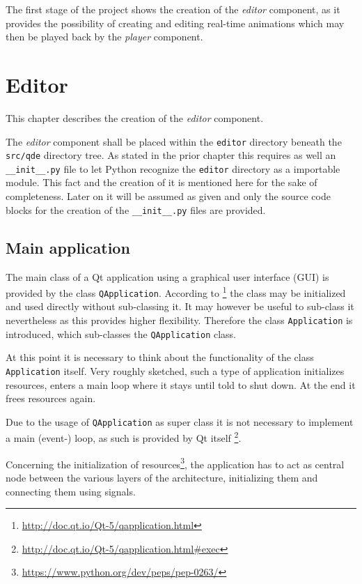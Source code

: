 \documentclass[10pt, openright, notitlepage]{scrreprt}
\begin{document}
The first stage of the project shows the creation of the \emph{editor} component, as
it provides the possibility of creating and editing real-time animations which
may then be played back by the \emph{player} component\cite[p. 29]{osterwalder_qde_2016}.

\section{Editor}
\label{sec:orgda4a1b1}

This chapter describes the creation of the \emph{editor} component.

The \emph{editor} component shall be placed within the \texttt{editor} directory beneath the
\texttt{src/qde} directory tree. As stated in the prior chapter this requires as well
an \texttt{\_\_init\_\_.py} file to let Python recognize the \texttt{editor} directory as a
importable module. This fact and the creation of it is mentioned here for the
sake of completeness. Later on it will be assumed as given and only the source
code blocks for the creation of the \texttt{\_\_init\_\_.py} files are provided.

\subsection{Main application}
\label{sec:org1b26239}

The main class of a Qt application using a graphical user interface (GUI)
is provided by the class \texttt{QApplication}. According to
\footnote{\url{http://doc.qt.io/Qt-5/qapplication.html}} the class may be initialized and
used directly without sub-classing it. It may however be useful to sub-class it
nevertheless as this provides higher flexibility. Therefore the class
\texttt{Application} is introduced, which sub-classes the \texttt{QApplication} class.

At this point it is necessary to think about the functionality of the class
\texttt{Application} itself. Very roughly sketched, such a type of application
initializes resources, enters a main loop where it stays until told to shut
down. At the end it frees resources again.

Due to the usage of \texttt{QApplication} as super class it is not necessary to
implement a main (event-) loop, as such is provided by Qt itself
\footnote{\url{http://doc.qt.io/Qt-5/qapplication.html\#exec}}.

Concerning the initialization of
resources\footnote{\url{https://www.python.org/dev/peps/pep-0263/}}, the application has
to act as central node between the various layers of the architecture,
initializing them and connecting them using signals.\cite[S. 37 bis 38]{osterwalder_qde_2016}
\end{document}
